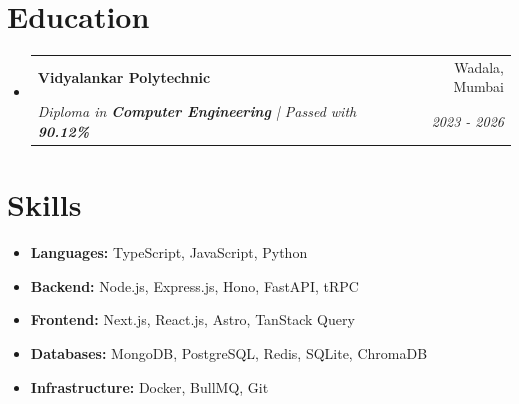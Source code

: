 \documentclass[letterpaper,11pt]{article}
\makeatletter
\newcommand{\resumeItem}[1]{\item\small{#1 \vspace{-2pt}}}
\newcommand{\resumeSubheading}[4]{
  \vspace{-2pt}\item
    \begin{tabular*}{0.97\textwidth}[t]{l@{\extracolsep{\fill}}r}
      \textbf{#1} & #2 \\
      \textit{\small#3} & \textit{\small #4} \\
    \end{tabular*}\vspace{-7pt}
}
\newcommand{\resumeItemListStart}{\begin{itemize}[leftmargin=0.15in]}
\newcommand{\resumeItemListEnd}{\end{itemize}\vspace{-5pt}}
\makeatother
\begin{document}
\section{Education}
\resumeItemListStart
  \resumeSubheading
    {Vidyalankar Polytechnic}{Wadala, Mumbai}
    {Diploma in \textbf{Computer Engineering} | Passed with \textbf{90.12\%}}{2023 - 2026}
\resumeItemListEnd

\section{Skills}
\resumeItemListStart
  \resumeItem{\textbf{Languages:} TypeScript, JavaScript, Python}
  \resumeItem{\textbf{Backend:} Node.js, Express.js, Hono, FastAPI, tRPC}
  \resumeItem{\textbf{Frontend:} Next.js, React.js, Astro, TanStack Query}
  \resumeItem{\textbf{Databases:} MongoDB, PostgreSQL, Redis, SQLite, ChromaDB}
  \resumeItem{\textbf{Infrastructure:} Docker, BullMQ, Git}
\resumeItemListEnd
\end{document}
